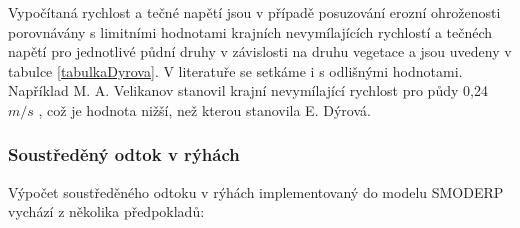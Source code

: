 Vypočítaná rychlost a tečné napětí jsou v případě posuzování erozní ohroženosti porovnávány s limitními hodnotami krajních nevymílajících rychlostí a tečnéch napětí pro jednotlivé půdní druhy v závislosti na druhu vegetace \citep{DyrovaE.1984} a jsou uvedeny v tabulce 
\ref{tabulkaDyrova}. %
V literatuře se setkáme i s odlišnými hodnotami. Například M. A. Velikanov stanovil krajní nevymílající rychlost pro půdy 0,24 $m/s$  \citep{CabikJ.1963}, což je hodnota nižší, než kterou stanovila E. Dýrová.


% 
% 
% 
% 
% 
% 
% 
% 
% 
% 
% 
\subsubsection{Soustředěný odtok v rýhách} \label{sec:soustredenyodtok}

Výpočet soustředěného odtoku v rýhách implementovaný do modelu SMODERP vychází z několika předpokladů:

